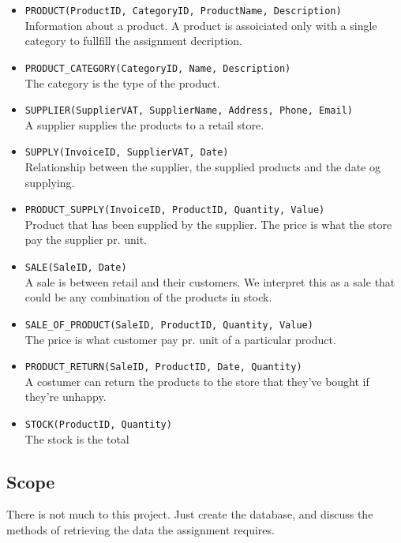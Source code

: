 \begin{itemize}
    \item \texttt{PRODUCT(ProductID, CategoryID, ProductName, Description)}\\
    Information about a product. A product is assoiciated only with a single category
    to fullfill the assignment decription.
    \item \texttt{PRODUCT\_CATEGORY(CategoryID, Name, Description)}\\
    The category is the type of the product.
    \item \texttt{SUPPLIER(SupplierVAT, SupplierName, Address, Phone, Email)}\\
    A supplier supplies the products to a retail store.
    \item \texttt{SUPPLY(InvoiceID, SupplierVAT, Date)}\\
    Relationship between the supplier, the supplied products and the date og supplying.
    \item \texttt{PRODUCT\_SUPPLY(InvoiceID, ProductID, Quantity, Value)}\\
    Product that has been supplied by the supplier.
    The price is what the store pay the supplier pr. unit.
    \item \texttt{SALE(SaleID, Date)}\\
    A sale is between retail and their customers. We interpret this as 
    a sale that could be any combination of the products in stock.
    \item \texttt{SALE\_OF\_PRODUCT(SaleID, ProductID, Quantity, Value)}\\
    The price is what customer pay pr. unit of a particular product.
    \item \texttt{PRODUCT\_RETURN(SaleID, ProductID, Date, Quantity)}\\
    A costumer can return the products to the store that they've bought if they're unhappy.
    \item \texttt{STOCK(ProductID, Quantity)}\\
    The stock is the total 
\end{itemize}



\subsection{Scope}
There is not much to this project. Just create the database, and discuss the methods of retrieving the data
the assignment requires.


